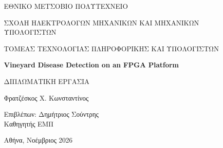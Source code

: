 %
\begin{titlepage}
\centering
\vspace*{2cm}

{\large ΕΘΝΙΚΟ ΜΕΤΣΟΒΙΟ ΠΟΛΥΤΕΧΝΕΙΟ\par}
{\large ΣΧΟΛΗ ΗΛΕΚΤΡΟΛΟΓΩΝ ΜΗΧΑΝΙΚΩΝ ΚΑΙ ΜΗΧΑΝΙΚΩΝ ΥΠΟΛΟΓΙΣΤΩΝ\par}
{\large ΤΟΜΕΑΣ ΤΕΧΝΟΛΟΓΙΑΣ ΠΛΗΡΟΦΟΡΙΚΗΣ ΚΑΙ ΥΠΟΛΟΓΙΣΤΩΝ\par}

\vspace{3.5cm}
{\LARGE\bfseries Vineyard Disease Detection on an FPGA Platform\par}

\vspace{2cm}
{\Large ΔΙΠΛΩΜΑΤΙΚΗ ΕΡΓΑΣΙΑ\par}

\vspace{1.5cm}
{\large Φρατζέσκος Χ. Κωνσταντίνος\par}

\vfill
\begin{flushleft}
Επιβλέπων: Δημήτριος Σούντρης\\
Καθηγητής ΕΜΠ
\end{flushleft}

\vspace{2cm}
{Αθήνα, Νοέμβριος 2026\par}
\end{titlepage}
\cleardoublepage
